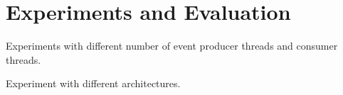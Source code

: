 \section{Experiments and Evaluation}\label{sec:experiments}


Experiments with different number of event producer threads and consumer threads. 

Experiment with different architectures. 



